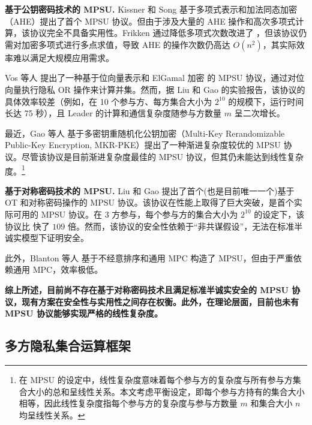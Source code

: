 \begin{trivlist}
\item \textbf{基于公钥密码技术的 MPSU.}
Kissner 和 Song \cite{KS-CRYPTO-2005} 基于多项式表示和加法同态加密（AHE）提出了首个 MPSU 协议。但由于涉及大量的 AHE 操作和高次多项式计算，该协议完全不具备实用性。Frikken \cite{Frikken-ACNS-2007} 通过降低多项式次数改进了 \cite{KS-CRYPTO-2005}，但该协议仍需对加密多项式进行多点求值，导致 AHE 的操作次数仍高达 $O(n^2)$，其实际效率难以满足大规模应用需求。

Vos 等人 \cite{VCE22} 提出了一种基于位向量表示和 ElGamal 加密 \cite{ElGamal-IEEE-IT-1985}的 MPSU 协议，通过对位向量执行隐私 OR 操作来计算并集。然而，据 Liu 和 Gao \cite{LG-ASIACRYPT-2023} 的实验报告，该协议的具体效率较差（例如，在 10 个参与方、每方集合大小为 $2^{10}$ 的规模下，运行时间长达 75 秒），且 Leader 的计算和通信复杂度随参与方数量 $m$ 呈二次增长。

最近，Gao 等人 \cite{GaoNT24} 基于多密钥重随机化公钥加密（Multi-Key Rerandomizable Public-Key Encryption, MKR-PKE）提出了一种渐进复杂度较优的 MPSU 协议。尽管该协议是目前渐进复杂度最佳的 MPSU 协议，但其仍未能达到线性复杂度。\footnote{在 MPSU 的设定中，线性复杂度意味着每个参与方的复杂度与所有参与方集合大小的总和呈线性关系。本文考虑平衡设定，即每个参与方持有的集合大小相等，因此线性复杂度指每个参与方的复杂度与参与方数量 $m$ 和集合大小 $n$ 均呈线性关系。}

\item \textbf{基于对称密码技术的 MPSU.}
Liu 和 Gao \cite{LG-ASIACRYPT-2023} 提出了首个(也是目前唯一一个)基于 OT 和对称密码操作的 MPSU 协议。该协议在性能上取得了巨大突破，是首个实际可用的 MPSU 协议。在 $3$ 方参与，每个参与方的集合大小为 $2^{10}$ 的设定下，该协议比 \cite{VCE22} 快了 $109$ 倍。然而，该协议的安全性依赖于“非共谋假设”，无法在标准半诚实模型下证明安全。

此外，Blanton 等人 \cite{BA-ASIACCS-2012} 基于不经意排序和通用 MPC 构造了 MPSU，但由于严重依赖通用 MPC，效率极低。
\end{trivlist}

\textbf{综上所述，目前尚不存在基于对称密码技术且满足标准半诚实安全的 MPSU 协议，现有方案在安全性与实用性之间存在权衡。此外，在理论层面，目前也未有 MPSU 协议能够实现严格的线性复杂度。}

\subsection{多方隐私集合运算框架}

